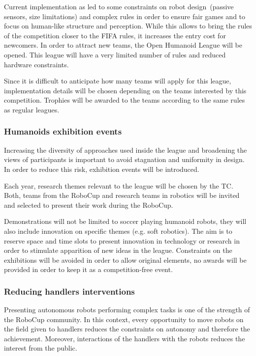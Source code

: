 \documentclass{article}
\begin{document}
Current implementation as led to some constraints on robot design~(passive
sensors, size limitations) and complex rules in order to ensure fair games and
to focus on human-like structure and perception.
While this allows to bring the rules of the competition closer to the FIFA rules,
it increases the entry cost for newcomers.
In order to attract new teams, the Open Humanoid League will be opened.
This league will have a very limited number of rules and reduced hardware constraints.

Since it is difficult to anticipate how many teams will apply for this league,
implementation details will be chosen depending on the teams interested by this
competition.
Trophies will be awarded to the teams according to the same rules as regular leagues.

\subsubsection{Humanoids exhibition events}

Increasing the diversity of approaches used inside the league and broadening the
views of participants is important to avoid stagnation and uniformity in design.
In order to reduce this risk, exhibition events will be introduced.

Each year, research themes relevant to the league will be chosen by the TC.
Both, teams from the RoboCup and research teams in robotics will be
invited and selected to present their work during the RoboCup.

Demonstrations will not be limited to soccer playing humanoid robots, they will
also include innovation on specific themes (e.g. soft robotics).
The aim is to reserve space and time slots to present innovation in technology
or research in order to stimulate apparition of new ideas in the league.
Constraints on the exhibitions will be avoided in order to allow original
elements, no awards will be provided in order to keep it as a competition-free
event.

\subsubsection{Reducing handlers interventions}
Presenting autonomous robots performing complex tasks is one of the strength of
the RoboCup community.
In this context, every opportunity to move robots on the field given to handlers
reduces the constraints on autonomy and therefore the achievement.
Moreover, interactions of the handlers with the robots reduces the interest from
the public.
\end{document}
